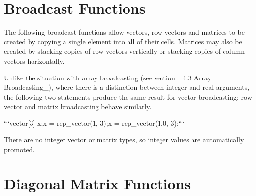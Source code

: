 \begin{description}
{\begin{description}
\section{Broadcast Functions}\label{matrix-broadcast.section}


The following broadcast functions allow vectors, row vectors and matrices to be created by copying a single element into all of their cells.  Matrices may also be created by stacking copies of row vectors vertically or stacking copies of column vectors horizontally.


\begin{description}                \end{description}


Unlike the situation with array broadcasting (see section _4.3 Array Broadcasting_), where there is a distinction between integer and real arguments, the following two statements produce the same result for vector broadcasting;  row vector and matrix broadcasting behave similarly.


```\n vector[3] x;\n x = rep_vector(1, 3);\n x = rep_vector(1.0, 3);\n ```


There are no integer vector or matrix types, so integer values are automatically promoted.


\section{Diagonal Matrix Functions}


\begin{description}   \end{description}



\end{description}}
\end{description}
